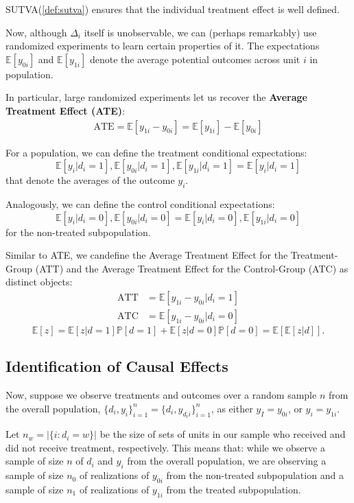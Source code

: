 SUTVA(\ref{def:sutva}) ensures that the individual treatment effect is well defined.

Now, although $\Delta_i$ itself is unobservable, we can (perhaps remarkably) 
use randomized experiments to learn certain properties of it. The expectations
$\mathbb{E}[y_{0i}]$ and $\mathbb{E}[y_{1i}]$ denote the average potential outcomes across unit $i$ in population.

In particular, large randomized experiments let us recover the \textbf{Average
Treatment Effect (ATE)}:
\begin{gather*}
  \text{ATE} = \mathbb{E}[y_{1i} - y_{0i}] = \mathbb{E}[y_{1i}] - \mathbb{E}[y_{0i}]
\end{gather*}

For a population, we can define the treatment conditional expectations:
\[\mathbb{E}[y_i | d_i=1], \mathbb{E}[y_{0i} | d_i=1 ], \mathbb{E}[y_{1i} | d_i=1 ] = \mathbb{E}[y_i | d_i=1]\]
that denote the averages of the outcome $y_i$.

Analogously, we can define the control conditional expectations:
\[\mathbb{E}[y_i | d_i=0], \mathbb{E}[y_{0i} | d_i=0 ] = \mathbb{E}[y_i | d_i=0], \mathbb{E}[y_{1i} | d_i=0 ]\]
for the non-treated subpopulation.

Similar to ATE, we candefine the Average Treatment Effect for the Treatment-Group (ATT) and the Average
Treatment Effect for the Control-Group (ATC) as distinct objects:
\begin{align*}
  \text{ATT} &= \mathbb{E}[y_{1i}- y_{0i} | d_i=1]\\
  \text{ATC} &= \mathbb{E}[y_{1i}- y_{0i} | d_i=0]
\end{align*}
\[\mathbb{E}[z] = \mathbb{E}[z|d=1] \mathbb{P}[d=1] + \mathbb{E}[z|d=0] \mathbb{P}[d=0] = \mathbb{E}[\mathbb{E}[z|d]].\]

\subsection{Identification of Causal Effects}

Now, suppose we observe treatments and outcomes over a random sample $n$ from the overall population, $\{d_i, y_i\}_{i=1}^n = \{d_i, y_{d_{i}i}\}_{i=1}^n$, 
as either $y_I = y_{0i} $, or $y_i = y_{1i}$. 

Let $n_{w} = \vert \{ i: d_i = w \} \vert $ be the size of sets of units in our
sample who received and did not receive treatment, respectively.
This means that: while we observe a sample of size $n$ of $d_i$ and $y_i$ from the overall population,
we are observing a sample of size $n_0$ of realizations of $y_{0i}$ from the non-treated subpopulation 
and a sample of size $n_1$ of realizations of $y_{1i}$ from the treated subpopulation.

